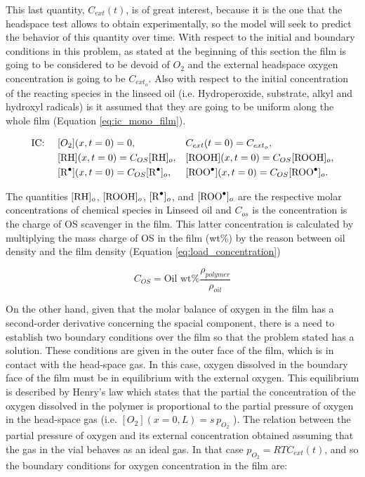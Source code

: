 \begin{refsection}
This last quantity, $C_{ext}(t)$, is of great interest,
because it is the one that the headspace test
allows to obtain experimentally, so the model
will seek to predict the behavior of this quantity
over time. With respect to the initial and boundary conditions in this problem, as stated at the beginning of this section the film is going to be considered to be devoid of $O_2$ and the external headspace oxygen concentration is going to be $C_{ext_o}$. Also with respect to the initial concentration of the reacting species in the linseed oil (i.e. Hydroperoxide, substrate, alkyl and hydroxyl radicals) is it assumed that they are going to be uniform along the whole film (Equation \ref{eq:ic_mono_film}). 

\begin{align}
    &\text{IC: } & &[O_2](x,t=0)=0, & &C_{ext}(t=0)= C_{ext_o},\nonumber\\
    && &[\ce{RH}](x,t=0)=C_{OS}[\ce{RH}]_o,   & &[\ce{ROOH}](x,t=0)=C_{OS}[\ce{ROOH}]_o, \nonumber\\
    && &[\ce{R^.}](x,t=0)=C_{OS}[\ce{R^.}]_o,   & &[\ce{ROO^.}](x,t=0)=C_{OS}[\ce{ROO^.}]_o. 
    \label{eq:ic_mono_film}
\end{align}
    
The quantities $[\ce{RH}]_o$, $[\ce{ROOH}]_o$,  $[\ce{R^.}]_o$, and $[\ce{ROO^.}]_o$ are the respective molar concentrations of chemical species in Linseed oil  and $C_{os}$ is the concentration is the charge of OS  scavenger in the film. This latter concentration is calculated by multiplying the mass charge of OS in the film (wt\%) by the reason between oil density and the film density (Equation \ref{eq:load_concentration})

\begin{equation}
    C_{OS}= \text{Oil wt}\% \frac{\rho_{polymer}}{\rho_{oil}}
    \label{eq:load_concentration}
\end{equation}

On the other hand, given that the molar balance of oxygen in the film has a second-order derivative concerning the spacial component, there is a need to establish two boundary conditions over the film so that the problem stated has a solution. These conditions are given in the outer face of the film, which is in contact with the head-space gas. In this case, oxygen dissolved in the boundary face of the film must be in equilibrium with the external oxygen. This equilibrium is described by Henry's law which states that the partial the concentration of the oxygen dissolved in the polymer is proportional to the partial pressure of oxygen in the head-space gas (i.e. $[O_2](x=0,L)=s\hspace{2pt}p_{O_2}$ ). The relation between the partial pressure of oxygen and its external concentration obtained assuming that the gas in the vial behaves as an ideal gas.  In that case $p_{O_2}=RTC_{ext}(t)$, and so the boundary conditions for oxygen concentration in the film are:


\end{refsection}
